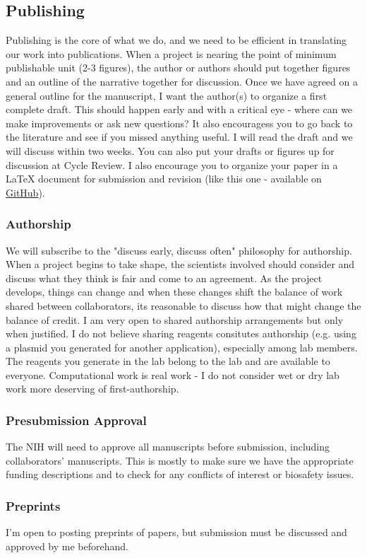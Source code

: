\documentclass[10pt, a4paper, twocolumn]{article} %
\begin{document}
\subsection{Publishing}
Publishing is the core of what we do, and we need to be efficient in translating our work into publications. When a project is nearing the point of minimum publishable unit (2-3 figures), the author or authors should put together figures and an outline of the narrative together for discussion. Once we have agreed on a general outline for the manuscript, I want the author(s) to organize a first complete draft. This should happen early and with a critical eye - where can we make improvements or ask new questions? It also encouragess you to go back to the literature and see if you missed anything useful. I will read the draft and we will discuss within two weeks. You can also put your drafts or figures up for discussion at Cycle Review. I also encourage you to organize your paper in a LaTeX document for submission and revision (like this one - available on \href{https://github.com/QVEU/QVEU/blob/main/ExpectationsDocument/main.tex}{GitHub}).
\subsubsection{Authorship}
We will subscribe to the "discuss early, discuss often" philosophy for authorship. When a project begins to take shape, the scientists involved should consider and discuss what they think is fair and come to an agreement. As the project develops, things can change and when these changes shift the balance of work shared between collaborators, its reasonable to discuss how that might change the balance of credit. I am very open to shared authorship arrangements but only when justified. I do not believe sharing reagents consitutes authorship (e.g. using a plasmid you generated for another application), especially among lab members. The reagents you generate in the lab belong to the lab and are available to everyone. Computational work is real work - I do not consider wet or dry lab work more deserving of first-authorship.
\subsubsection{Presubmission Approval}
The NIH will need to approve all manuscripts before submission, including collaborators' manuscripts. This is mostly to make sure we have the appropriate funding descriptions and to check for any conflicts of interest or biosafety issues.
\subsubsection{Preprints}
I'm open to posting preprints of papers, but submission must be discussed and approved by me beforehand.
\end{document}
